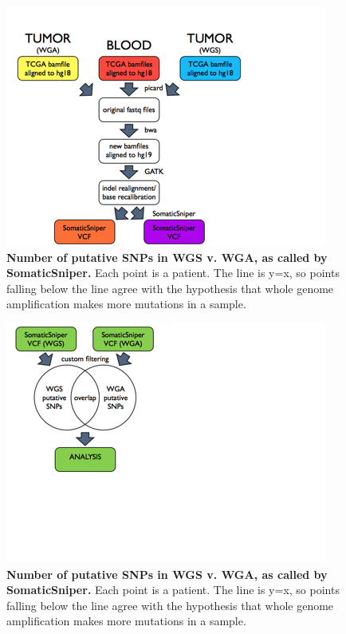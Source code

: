 \documentclass[11pt]{article} %
\begin{document}
\begin{figure}
\includegraphics[scale=1.0]{data_processing_flowchart_2.png}
\caption{\textbf{Number of putative SNPs in WGS v. WGA, as called by SomaticSniper.} Each point is a patient. The line is y=x, so points falling below the line agree with the hypothesis that whole genome amplification makes more mutations in a sample.}
\end{figure}

\begin{figure}
\includegraphics[scale=1.0]{overlap_explained.png}
\caption{\textbf{Number of putative SNPs in WGS v. WGA, as called by SomaticSniper.} Each point is a patient. The line is y=x, so points falling below the line agree with the hypothesis that whole genome amplification makes more mutations in a sample.}
\end{figure}
\end{document}

